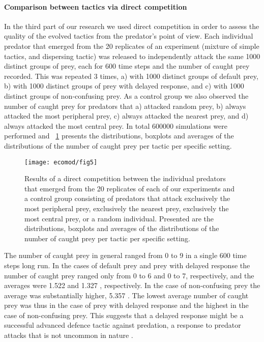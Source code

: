 \paragraph{Comparison between tactics via direct competition} In the third part of our research we used direct competition in order to assess the quality of the evolved tactics from the predator's point of view. Each individual predator that emerged from the 20 replicates of an experiment (mixture of simple tactics, and dispersing tactic) was released to independently attack the same \num{1000} distinct groups of prey, each for 600 time steps and the number of caught prey recorded. This was repeated 3 times, a) with 1000 distinct groups of default prey, b) with 1000 distinct groups of prey with delayed response, and c) with 1000 distinct groups of non-confusing prey. As a control group we also observed the number of caught prey for predators that a) attacked random prey, b) always attacked the most peripheral prey, c) always attacked the nearest prey, and d) always attacked the most central prey. In total \num{600000} simulations were performed and \figurename~\ref{fig:mvsd} presents the distributions, boxplots and averages of the distributions of the number of caught prey per tactic per specific setting.

\begin{figure}
  \texttt{[image: ecomod/fig5]}
  \caption{Results of a direct competition between the individual predators that emerged from the 20 replicates of each of our experiments and a control group consisting of predators that attack exclusively the most peripheral prey, exclusively the nearest prey, exclusively the most central prey, or a random individual. Presented are the distributions, boxplots and averages of the distributions of the number of caught prey per tactic per specific setting.}
  \label{fig:mvsd}
\end{figure}

The number of caught prey in general ranged from 0 to 9 in a single 600 time steps long run. In the cases of default prey and prey with delayed response the number of caught prey ranged only from 0 to 6 and 0 to 7, respectively, and the averages were \num{1.522}  and \num{1.327} , respectively. In the case of non-confusing prey the average was substantially higher, \ie \num{5.357} . The lowest average number of caught prey was thus in the case of prey with delayed response and the highest in the case of non-confusing prey. This suggests that a delayed response might be a successful advanced defence tactic against predation, a response to predator attacks that is not uncommon in nature \cite{partridge1982structure}.

